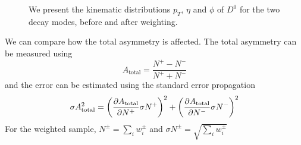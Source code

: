 \documentclass{article}
\begin{document}
    \begin{figure}[h!]
        \centering
        \hfill

        \caption{We present the kinematic distributions $p_T$, $\eta$ and $\phi$ of $D^0$ for the two decay modes, before and after weighting.}
    \end{figure}

    We can compare how the total asymmetry is affected.
    The total asymmetry can be measured using
    \begin{equation}
        A_{\text{total}} = \frac{N^+ - N^-}{N^+ + N^-}
    \end{equation}
    and the error can be estimated using the standard error propagation
    \begin{equation}
        \sigma A_{\text{total}} ^2 = \left(\pdv{A_{\text{total}}}{N^+}\sigma N^+\right)^2 + \left(\pdv{A_{\text{total}}}{N^-}\sigma N^-\right)^2
    \end{equation}
    For the weighted sample, $N^{\pm} = \sum_i w^\pm_i$ and $\sigma N^\pm = \sqrt{\sum_i w_i^\pm}$
\end{document}
